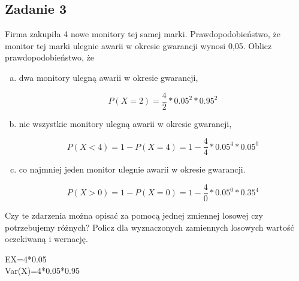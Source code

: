 \subsection{Zadanie 3}

\begin{enumerate}[label=(\alph*)]
Firma zakupiła 4 nowe monitory tej samej marki. Prawdopodobieństwo, że monitor tej marki ulegnie awarii w okresie gwarancji wynosi 0,05. Oblicz prawdopodobieństwo, że
\begin{enumerate}[a)]
\item dwa monitory ulegną awarii w okresie gwarancji,

$$
P(X=2) = \frac{4}{2} * 0.05^{2}* 0.95^{2}
$$

\item nie wszystkie monitory ulegną awarii w okresie gwarancji,

$$
P(X<4)=1-P(X=4)=1- \frac{4}{4} * 0.05^{4} * 0.05^{0}
$$


\item co najmniej jeden monitor ulegnie awarii w okresie gwarancji.

$$
P(X>0)=1- P(X=0)=1- \frac{4}{0} * {0.05}^0 * {0.35}^4
$$

\end{enumerate}
Czy te zdarzenia można opisać za pomocą jednej zmiennej losowej czy potrzebujemy różnych? 
Policz dla wyznaczonych zamiennych losowych wartość oczekiwaną i wernację.

$$
$$ 
EX=4*{0.05}
$$
$$
Var(X)=4*{0.05}*{0.95}
$$


\end{enumerate}
